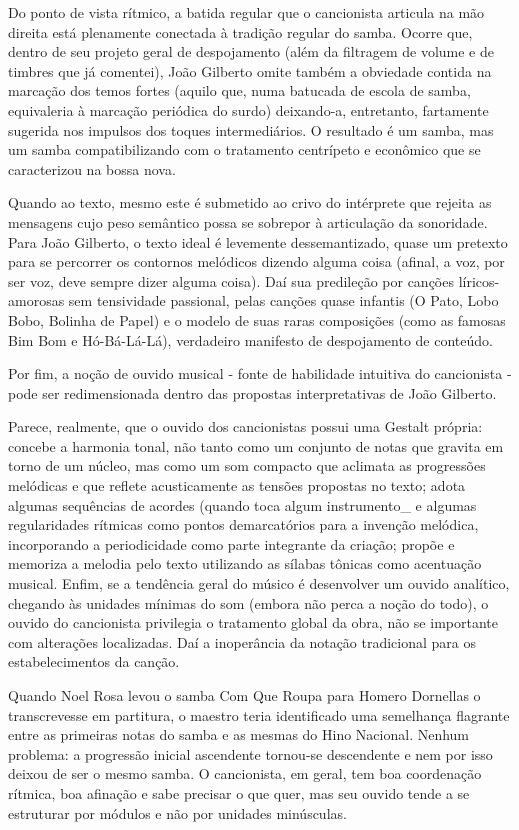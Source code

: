 Do ponto de vista rítmico, a batida regular que o cancionista articula
na mão direita está plenamente conectada à tradição regular do samba.
Ocorre que, dentro de seu projeto geral de despojamento (além da
filtragem de volume e de timbres que já comentei), João Gilberto omite
também a obviedade contida na marcação dos temos fortes (aquilo que,
numa batucada de escola de samba, equivaleria à marcação periódica do
surdo) deixando-a, entretanto, fartamente sugerida nos impulsos dos
toques intermediários. O resultado é um samba, mas um samba
compatibilizando com o tratamento centrípeto e econômico que se
caracterizou na bossa nova.

Quando ao texto, mesmo este é submetido ao crivo do intérprete que
rejeita as mensagens cujo peso semântico possa se sobrepor à articulação
da sonoridade. Para João Gilberto, o texto ideal é levemente
dessemantizado, quase um pretexto para se percorrer os contornos
melódicos dizendo alguma coisa (afinal, a voz, por ser voz, deve sempre
dizer alguma coisa). Daí sua predileção por canções líricos-amorosas sem
tensividade passional, pelas canções quase infantis (O Pato, Lobo Bobo,
Bolinha de Papel) e o modelo de suas raras composições (como as famosas
Bim Bom e Hó-Bá-Lá-Lá), verdadeiro manifesto de despojamento de
conteúdo.

Por fim, a noção de ouvido musical - fonte de habilidade intuitiva do
cancionista - pode ser redimensionada dentro das propostas
interpretativas de João Gilberto.

Parece, realmente, que o ouvido dos cancionistas possui uma Gestalt
própria: concebe a harmonia tonal, não tanto como um conjunto de notas
que gravita em torno de um núcleo, mas como um som compacto que aclimata
as progressões melódicas e que reflete acusticamente as tensões
propostas no texto; adota algumas sequências de acordes (quando toca
algum instrumento\_ e algumas regularidades rítmicas como pontos
demarcatórios para a invenção melódica, incorporando a periodicidade
como parte integrante da criação; propõe e memoriza a melodia pelo texto
utilizando as sílabas tônicas como acentuação musical. Enfim, se a
tendência geral do músico é desenvolver um ouvido analítico, chegando às
unidades mínimas do som (embora não perca a noção do todo), o ouvido do
cancionista privilegia o tratamento global da obra, não se importante
com alterações localizadas. Daí a inoperância da notação tradicional
para os estabelecimentos da canção.

Quando Noel Rosa levou o samba Com Que Roupa para Homero Dornellas o
transcrevesse em partitura, o maestro teria identificado uma semelhança
flagrante entre as primeiras notas do samba e as mesmas do Hino
Nacional. Nenhum problema: a progressão inicial ascendente tornou-se
descendente e nem por isso deixou de ser o mesmo samba. O cancionista,
em geral, tem boa coordenação rítmica, boa afinação e sabe precisar o
que quer, mas seu ouvido tende a se estruturar por módulos e não por
unidades minúsculas.

